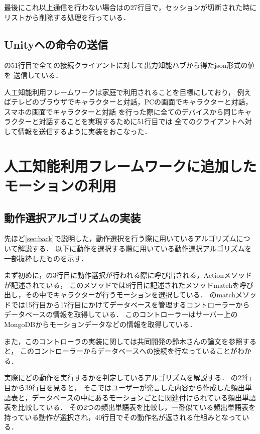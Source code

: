 最後にこれ以上通信を行わない場合はの27行目で，セッションが切断された時にリストから削除する処理を行っている．

\subsection{Unityへの命令の送信}
の51行目で全ての接続クライアントに対して出力知能ハブから得たjson形式の値を
送信している．

人工知能利用フレームワークは家庭で利用されることを目標にしており，
例えばテレビのブラウザでキャラクターと対話，PCの画面でキャラクターと対話，スマホの画面でキャラクターと対話
を行った際に全てのデバイスから同じキャラクターと対話することを実現するために51行目では
全てのクライアントへ対して情報を送信するように実装をおこなった．


\section{人工知能利用フレームワークに追加したモーションの利用}\label{sec:motion}
\subsection{動作選択アルゴリズムの実装}
先ほど\ref{sec:back}で説明した，動作選択を行う際に用いているアルゴリズムについて解説する．
以下に動作を選択する際に用いている動作選択アルゴリズムを一部抜粋したものを示す．


まず初めに，の3行目に動作選択が行われる際に呼び出される，Actionメソッドが記述されている，
このメソッドでは8行目に記述されたメソッドmatchを呼び出し，その中でキャラクターが行うモーションを選択している．
のmatchメソッドでは15行目から17行目にかけてデータベースを管理するコントローラーから
データベースの情報を取得している．
このコントローラーはサーバー上のMongoDBからモーションデータなどの情報を取得している．

また，このコントローラの実装に関しては共同開発の鈴木さんの論文\cite{suzuki}を参照すると，
このコントローラーからデータベースへの接続を行なっていることがわかる．

実際にどの動作を実行するかを判定しているアルゴリズムを解説する．
の22行目から39行目を見ると，
そこではユーザーが発言した内容から作成した頻出単語表と，データベースの中にあるモーションごとに関連付けられている頻出単語表を比較している．
その2つの頻出単語表を比較し，一番似ている頻出単語表を持っている動作が選択され，40行目でその動作名が返される仕組みとなっている．

